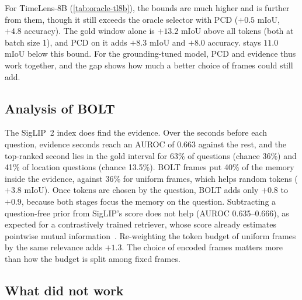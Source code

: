For TimeLens-8B (\cref{tab:oracle-tl8b}), the bounds are much higher and \method is further from them, though it still
exceeds the oracle selector with PCD ($+0.5$ mIoU, $+4.8$ accuracy). The gold window alone is $+13.2$ mIoU above all
tokens (both at batch size 1), and PCD on it adds $+8.3$ mIoU and $+8.0$ accuracy. \method stays $11.0$ mIoU below
this bound. For the grounding-tuned model, PCD and evidence thus work together, and the gap shows how much a better
choice of frames could still add.

\subsection{Analysis of BOLT}
\label{sec:res-retrieval}

The SigLIP~2 index does find the evidence. Over the seconds before each question, evidence seconds reach an AUROC of
0.663 against the rest, and the top-ranked second lies in the gold interval for 63\% of questions (chance 36\%) and
41\% of location questions (chance 13.5\%). BOLT frames put 40\% of the memory inside the evidence, against 36\% for
uniform frames, which helps random tokens ($+3.8$ mIoU). Once tokens are chosen by the question, BOLT adds only $+0.8$
to $+0.9$, because both stages focus the memory on the question. Subtracting a question-free prior from SigLIP's score
does not help (AUROC 0.635--0.666), as expected for a contrastively trained retriever, whose score already estimates
pointwise mutual information~\cite{siglip2}. Re-weighting the token budget of uniform frames by the same relevance
adds $+1.3$. The choice of encoded frames matters more than how the budget is split among fixed frames.

\subsection{What did not work}
\label{sec:negative}

